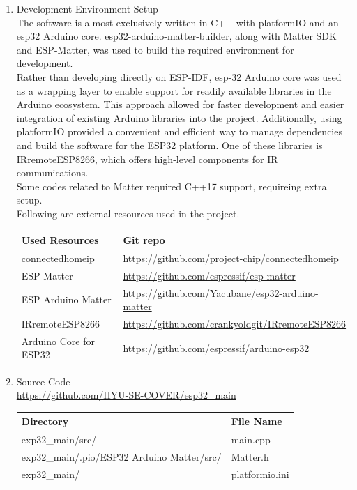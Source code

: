 \documentclass[conference]{IEEEtran}
\begin{document}
\begin{enumerate}[label=\arabic*.]
\item Development Environment Setup\\
The software is almost exclusively written in C++ with platformIO and an esp32 Arduino core. esp32-arduino-matter-builder, along with Matter SDK and ESP-Matter, was used to build the required environment for development.\\
Rather than developing directly on ESP-IDF, esp-32 Arduino core was used as a wrapping layer to enable support for readily available libraries in the Arduino ecosystem. This approach allowed for faster development and easier integration of existing Arduino libraries into the project. Additionally, using platformIO provided a convenient and efficient way to manage dependencies and build the software for the ESP32 platform. One of these libraries is IRremoteESP8266, which offers high-level components for IR communications.\\
Some codes related to Matter required C++17 support, requireing extra setup.\\
Following are external resources used in the project.\\
\begin{table}[h!]
\setlength{\extrarowheight}{2.5pt}
\centering
\begin{tabular}{|l|p{4cm}|}
\hline
\textbf{Used Resources} & \textbf{Git repo} \\ \hline
connectedhomeip & \url{https://github.com/project-chip/connectedhomeip} \\ \hline
ESP-Matter & \url{https://github.com/espressif/esp-matter} \\ \hline
ESP Arduino Matter & \url{https://github.com/Yacubane/esp32-arduino-matter} \\ \hline
IRremoteESP8266 & \url{https://github.com/crankyoldgit/IRremoteESP8266} \\ \hline
Arduino Core for ESP32 & \url{https://github.com/espressif/arduino-esp32} \\ \hline
\end{tabular}
\end{table}

\item Source Code\\
\url{https://github.com/HYU-SE-COVER/esp32\_main}
\begin{table}[h!]
\setlength{\extrarowheight}{2.5pt}
\centering
\begin{tabular}{|l|l|}
\hline
\textbf{Directory} & \textbf{File Name} \\ \hline
exp32\_main/src/ & main.cpp \\ \hline
exp32\_main/.pio/ESP32 Arduino Matter/src/ & Matter.h \\ \hline
exp32\_main/ & platformio.ini \\ \hline
\end{tabular}
\end{table}


\end{enumerate}
\end{document}
